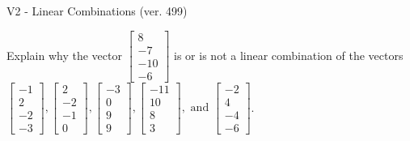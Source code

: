 \begin{exercise}
  \begin{exerciseTitle}V2 - Linear Combinations (ver. 499)\end{exerciseTitle}
  \begin{exerciseStatement}
    Explain why the vector \(\left[\begin{array}{c}
8 \\
-7 \\
-10 \\
-6
\end{array}\right]\)  is or is not a linear 
	combination of the vectors \(\left[\begin{array}{c}
-1 \\
2 \\
-2 \\
-3
\end{array}\right] , \left[\begin{array}{c}
2 \\
-2 \\
-1 \\
0
\end{array}\right] , \left[\begin{array}{c}
-3 \\
0 \\
9 \\
9
\end{array}\right] , \left[\begin{array}{c}
-11 \\
10 \\
8 \\
3
\end{array}\right] , \text{ and } \left[\begin{array}{c}
-2 \\
4 \\
-4 \\
-6
\end{array}\right]\).
	



\end{exerciseStatement}
\end{exercise}
